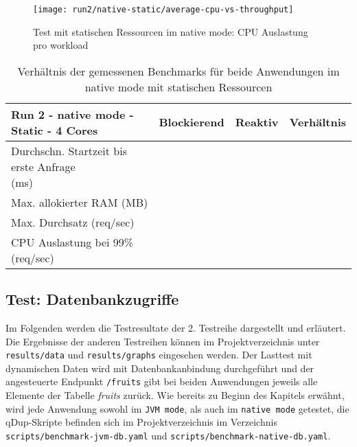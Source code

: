 \begin{figure}[ht!]
    \centering
    \texttt{[image: run2/native-static/average-cpu-vs-throughput]}
    \caption{Test mit statischen Ressourcen im native mode: CPU Auslastung pro workload}
    \label{fig:native_static_avg_cpu}
\end{figure}

\begin{table}[ht!]
    \begin{tabular}{|l | c | c | c|}
        \hline
        Run 2 - native mode - Static - 4 Cores & Blockierend & Reaktiv & Verhältnis \\
        \hline
        \makecell{Durchschn. Startzeit bis erste Anfrage                            \\(ms)} &       &   &      \\
        \hline
        Max. allokierter RAM (MB)              &             &         &            \\
        \hline
        Max. Durchsatz (req/sec)               &             &         &            \\
        \hline
        CPU Auslastung bei 99\% (req/sec)      &             &         &            \\
        \hline
    \end{tabular}
    \caption{Verhältnis der gemessenen Benchmarks für beide Anwendungen im native mode mit statischen Ressourcen}
    \label{table:static_native_measurement_results}
\end{table}





\subsection{Test: Datenbankzugriffe}
\label{section:datenbankzugriffe}
Im Folgenden werden die Testresultate der 2. Testreihe dargestellt und erläutert.
Die Ergebnisse der anderen Testreihen können im Projektverzeichnis unter \verb|results/data| und \verb|results/graphs| eingesehen werden.
Der Lasttest mit dynamischen Daten wird mit Datenbankanbindung durchgeführt und der angesteuerte Endpunkt \verb|/fruits| gibt bei beiden Anwendungen
jeweils alle Elemente der Tabelle \textit{fruits} zurück. Wie bereits zu Beginn des Kapitels erwähnt, wird jede Anwendung sowohl im \verb|JVM mode|, als auch im
\verb|native mode| getestet, die qDup-Skripte befinden sich im Projektverzeichnis im Verzeichnis \verb|scripts/benchmark-jvm-db.yaml| und
\verb|scripts/benchmark-native-db.yaml|.

